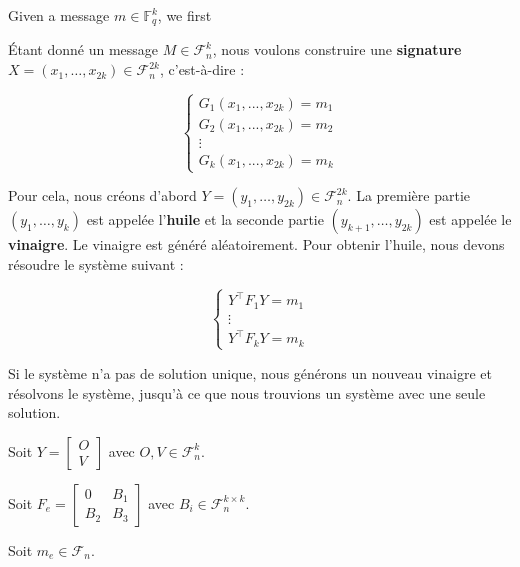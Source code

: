 \documentclass[12pt, a4paper]{article}
\begin{document}
	Given a message $m \in \mathbb{F}_q^{k}$, we first 
	
	Étant donné un message $M \in \mathcal{F}_n^k$, nous voulons construire une \textbf{signature} $X = (x_1, \dots, x_{2k}) \in \mathcal{F}_n^{2k}$, c'est-à-dire :
	
	$$
	\begin{cases}
		G_1(x_1,...,x_{2k}) = m_1 \\
		G_2(x_1,...,x_{2k}) = m_2 \\
		\vdots \\
		G_k(x_1,...,x_{2k}) = m_k
	\end{cases}
	$$
	
	Pour cela, nous créons d'abord $Y = (y_1, \dots, y_{2k}) \in \mathcal{F}_n^{2k}$. La première partie $(y_1, \dots, y_k)$ est appelée l'\textbf{huile} et la seconde partie $(y_{k + 1}, \dots, y_{2k})$ est appelée le \textbf{vinaigre}. Le vinaigre est généré aléatoirement. Pour obtenir l'huile, nous devons résoudre le système suivant :
	
	$$
	\begin{cases}
		Y^\top F_1 Y = m_1 \\
		\vdots \\
		Y^\top F_k Y = m_k
	\end{cases}
	$$
	
	Si le système n'a pas de solution unique, nous générons un nouveau vinaigre et résolvons le système, jusqu'à ce que nous trouvions un système avec une seule solution.
	
	Soit $Y = \begin{bmatrix} O \\ V \end{bmatrix}$ avec $O, V \in \mathcal{F}_n^k$.
	
	Soit $F_e =
	\begin{bmatrix}
		0 & B_1 \\
		B_2 & B_3
	\end{bmatrix}$ avec $B_i \in \mathcal{F}_n^{k \times k}$.
	
	Soit $m_e \in \mathcal{F}_n$.
	
\end{document}
